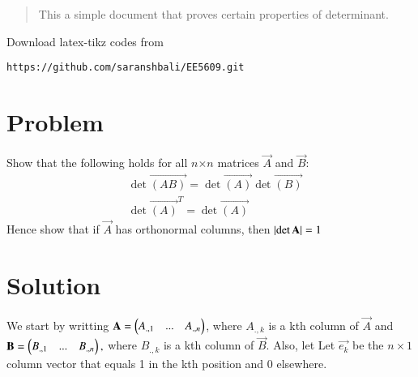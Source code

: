 \documentclass[journal,12pt,twocolumn]{IEEEtran}
\begin{document}
%
\begin{abstract}
This a simple document that proves certain properties of determinant.
\end{abstract}
%
%
Download latex-tikz codes from 
%
\begin{lstlisting}
https://github.com/saranshbali/EE5609.git
\end{lstlisting}
%
\section{Problem}
Show that the following holds for all $n$$\times$$n$ matrices $\vec{A}$ and $\vec{B}$:
\begin{align}
& \det\vec{(AB)} = \det\vec{(A)}\det\vec{(B)} \\
& \det\vec{(A)}^T = \det\vec{(A)}
\end{align}  
Hence show that if $\vec{A}$ has orthonormal columns, then $\left\vert\det\mathbf{A}\right\vert = 1$
\section{Solution}
We start by writting $\mathbf{A} = \begin{pmatrix}A_{.,1} & ... & A_{.,n}\end{pmatrix}$, where  $A_{.,k}$ is a kth column of $\vec{A}$ and $\mathbf{B} = \begin{pmatrix}B_{.,1} & ... & B_{.,n}\end{pmatrix},$ where $B_{.,k}$ is a kth column of $\vec{B}$. Also, let Let $\vec{e_k}$ be the $n\times1$ column vector that equals 1 in the kth position and 0 elsewhere.
\end{document}
